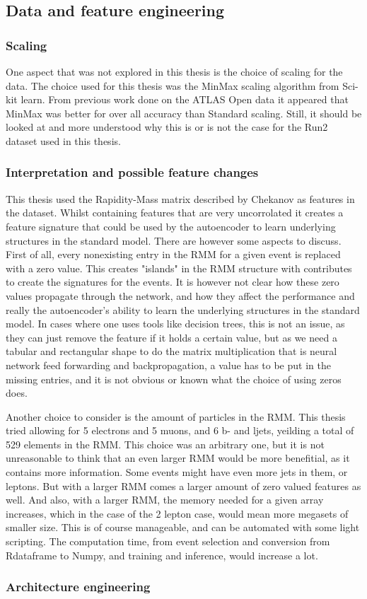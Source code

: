 \subsection*{Data and feature engineering}
\subsubsection*{Scaling}
One aspect that was not explored in this thesis is the choice of scaling for the data. The choice used for this 
thesis was the MinMax scaling algorithm from Sci-kit learn. From previous work done on the ATLAS Open data 
\cite{ATL-OREACH-PUB-2020-001} it appeared that MinMax was better for over all accuracy than Standard scaling.
Still, it should be looked at and more understood why this is or is not the case for the Run2 dataset used in this 
thesis. 

\subsubsection*{Interpretation and possible feature changes}
This thesis used the Rapidity-Mass matrix described by Chekanov\cite{Chekanov_2019} as features in the dataset. 
Whilst containing features that are very uncorrolated it creates a feature signature that could be used by 
the autoencoder to learn underlying structures in the standard model. There are however some aspects to discuss. 
First of all, every nonexisting entry in the RMM for a given event is replaced with a zero value. This creates 
"islands" in the RMM structure with contributes to create the signatures for the events. It is however not clear 
how these zero values propagate through the network, and how they affect the performance and really the autoencoder's 
ability to learn the underlying structures in the standard model. In cases where one uses tools like decision trees, 
this is not an issue, as they can just remove the feature if it holds a certain value, but as we need a tabular and 
rectangular shape to do the matrix multiplication that is neural network feed forwarding and backpropagation, a value
has to be put in the missing entries, and it is not obvious or known what the choice of using zeros does. \par 
Another choice to consider is the amount of particles in the RMM. This thesis tried allowing for 5 electrons and 5 muons, 
and 6 b- and ljets, yeilding a total of 529 elements in the RMM. This choice was an arbitrary one, but it is not 
unreasonable to think that an even larger RMM would be more benefitial, as it contains more information. Some 
events might have even more jets in them, or leptons. But with a larger RMM comes a larger amount of zero valued 
features as well. And also, with a larger RMM, the memory needed for a given array increases, which in the case of
the 2 lepton case, would mean more megasets of smaller size. This is of course manageable, and can be automated with 
some light scripting. The computation time, from event selection and conversion from Rdataframe to Numpy, and training 
and inference, would increase a lot. 



\subsubsection*{Architecture engineering}

